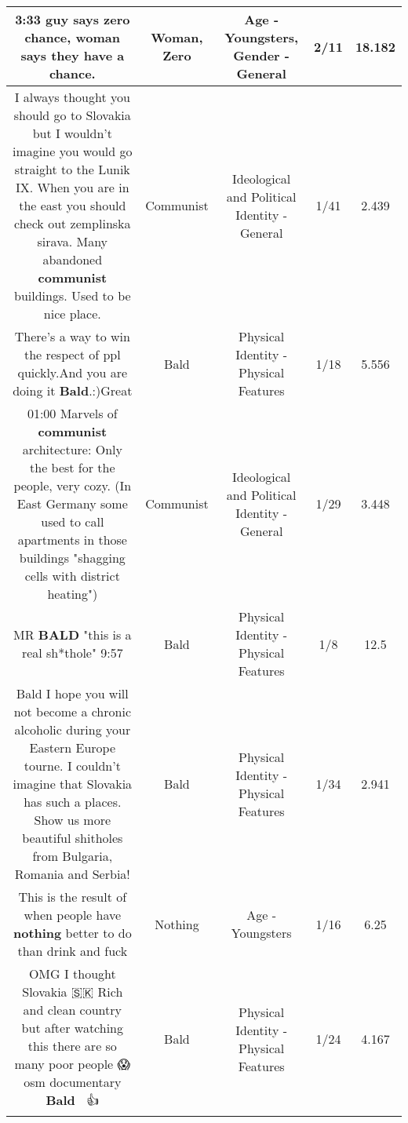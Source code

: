 \documentclass[11pt]{article}
\newlength\mylength
\begin{document}
\begin{center}
\begin{longtable}{|C{.65\mylength}|C{.30\mylength}|C{.12\mylength}|C{.12\mylength}|C{.12\mylength}|}
  \small 3:33 guy says \textbf{zero} chance, \textbf{woman} says they have a chance.\normalsize   & Woman, Zero & Age - Youngsters, Gender - General & 2/11 & 18.182 \\  \hline
  \small I always thought you should go to Slovakia but I wouldn't imagine you would go straight to the Lunik IX. When you are in the east you should check out zemplinska sirava. Many abandoned \textbf{communist} buildings. Used to be nice place.\normalsize   & Communist &  Ideological and Political Identity - General & 1/41 & 2.439 \\  \hline
  \small There's a way to win the respect of ppl quickly.And you are doing it \textbf{Bald}.:)Great\normalsize   & Bald & Physical Identity - Physical Features & 1/18 & 5.556 \\  \hline
  \small 01:00 Marvels of \textbf{communist} architecture: Only the best for the people, very cozy. (In East Germany some  used to call apartments in those buildings "shagging cells with district heating")\normalsize   & Communist &  Ideological and Political Identity - General & 1/29 & 3.448 \\  \hline
  \small MR \textbf{BALD} "this is a real sh*thole" 9:57\normalsize   & Bald & Physical Identity - Physical Features & 1/8 & 12.5 \\  \hline
  \small Bald I hope you will not become a chronic alcoholic during your Eastern Europe tourne. I couldn't imagine that Slovakia has such a places. Show us more beautiful shitholes from Bulgaria, Romania and Serbia!\normalsize   & Bald & Physical Identity - Physical Features & 1/34 & 2.941 \\  \hline
  \small This is the result of when people have \textbf{nothing} better to do than drink and fuck\normalsize   & Nothing & Age - Youngsters & 1/16 & 6.25 \\  \hline
  \small OMG I thought Slovakia 🇸🇰 Rich and clean country but after watching this there are so many poor people 😱 osm documentary \textbf{Bald} 👏🏻👍\normalsize   & Bald & Physical Identity - Physical Features & 1/24 & 4.167 \\  \hline

\end{longtable}
\end{center}
\end{document}
